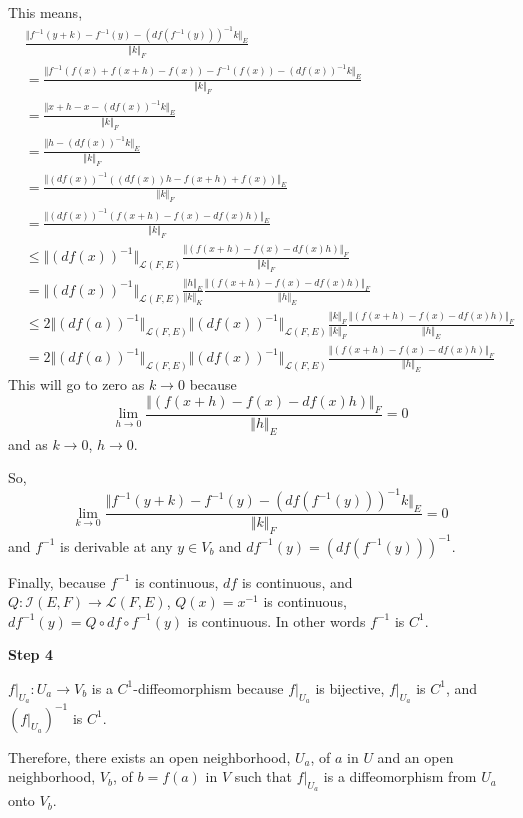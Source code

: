 \documentclass{article}
\begin{document}
This means,
\begin{align*}
    &\frac{\Vert f^{-1}(y+k)-f^{-1}(y)-(df(f^{-1}(y)))^{-1}k\Vert_E}{\Vert k\Vert_F}\\
    &=\frac{\Vert f^{-1}(f(x)+f(x+h)-f(x))-f^{-1}(f(x))-(df(x))^{-1}k\Vert_E}{\Vert k\Vert_F}\\
    &=\frac{\Vert x+h-x-(df(x))^{-1}k\Vert_E}{\Vert k\Vert_F}\\
    &=\frac{\Vert h-(df(x))^{-1}k\Vert_E}{\Vert k\Vert_F}\\
    &=\frac{\Vert (df(x))^{-1}((df(x))h-f(x+h)+f(x))\Vert_E}{\Vert k\Vert_F}\\
    &=\frac{\Vert (df(x))^{-1}(f(x+h)-f(x)-df(x)h)\Vert_E}{\Vert k\Vert_F}\\
    &\leq\Vert (df(x))^{-1}\Vert_{\mathcal{L}(F,E)}\frac{\Vert(f(x+h)-f(x)-df(x)h)\Vert_F}{\Vert k\Vert_F}\\
    &=\Vert (df(x))^{-1}\Vert_{\mathcal{L}(F,E)}\frac{\Vert h\Vert_E}{\Vert k\Vert_K}\frac{\Vert(f(x+h)-f(x)-df(x)h)\Vert_F}{\Vert h\Vert_E}\\
    &\leq2\Vert (df(a))^{-1}\Vert_{\mathcal{L}(F,E)}\Vert (df(x))^{-1}\Vert_{\mathcal{L}(F,E)}\frac{\Vert k\Vert_F}{\Vert k\Vert_F}\frac{\Vert (f(x+h)-f(x)-df(x)h)\Vert_F}{\Vert h\Vert_E}\\
    &=2\Vert (df(a))^{-1}\Vert_{\mathcal{L}(F,E)}\Vert (df(x))^{-1}\Vert_{\mathcal{L}(F,E)}\frac{\Vert(f(x+h)-f(x)-df(x)h)\Vert_F}{\Vert h\Vert_E}
\end{align*}
This will go to zero as \(k\to 0\) because
\[\lim_{h\to 0}\frac{\Vert(f(x+h)-f(x)-df(x)h)\Vert_F}{\Vert h\Vert_E}=0\]
and as \(k\to 0\), \(h\to 0\).

So,
\[\lim_{k\to 0}\frac{\Vert f^{-1}(y+k)-f^{-1}(y)-(df(f^{-1}(y)))^{-1}k\Vert_E}{\Vert k\Vert_F}=0\]
and \(f^{-1}\) is derivable at any \(y\in V_b\) and \(df^{-1}(y)=(df(f^{-1}(y)))^{-1}\).

Finally, because \(f^{-1}\) is continuous, \(df\) is continuous, and \(Q:\mathcal{I}(E,F)\to\mathcal{L}(F,E)\), \(Q(x)=x^{-1}\) is continuous, \(df^{-1}(y)=Q\circ df\circ f^{-1}(y)\) is continuous. In other words \(f^{-1}\) is \(C^1\).

\textbf{Step 4}

\(f|_{U_a}:U_a\to V_b\) is a \(C^1\)-diffeomorphism because \(f|_{U_a}\) is bijective, \(f|_{U_a}\) is \(C^1\), and \((f|_{U_a})^{-1}\) is \(C^1\).

Therefore, there exists an open neighborhood, \(U_a\), of \(a\) in \(U\) and an open neighborhood, \(V_b\), of \(b=f(a)\) in \(V\) such that \(f|_{U_a}\) is a diffeomorphism from \(U_a\) onto \(V_b\).
\end{document}

